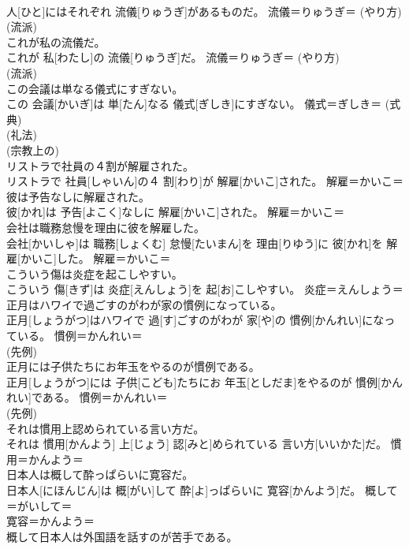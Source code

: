 \documentclass[8pt]{extreport}
\begin{document}
\begin{CJK}{UTF8}{min}
{\\	人[ひと]にはそれぞれ 流儀[りゅうぎ]があるものだ。	流儀＝りゅうぎ＝ (やり方) 
\\	(流派) 
\\	これが私の流儀だ。	
\\	これが 私[わたし]の 流儀[りゅうぎ]だ。	流儀＝りゅうぎ＝ (やり方) 
\\	(流派) 
\\	この会議は単なる儀式にすぎない。	
\\	この 会議[かいぎ]は 単[たん]なる 儀式[ぎしき]にすぎない。	儀式＝ぎしき＝ (式典) 
\\	(礼法) 
\\	(宗教上の) 
\\	リストラで社員の４割が解雇された。	
\\	リストラで 社員[しゃいん]の４ 割[わり]が 解雇[かいこ]された。	解雇＝かいこ＝ 
\\	彼は予告なしに解雇された。	
\\	彼[かれ]は 予告[よこく]なしに 解雇[かいこ]された。	解雇＝かいこ＝ 
\\	会社は職務怠慢を理由に彼を解雇した。	
\\	会社[かいしゃ]は 職務[しょくむ] 怠慢[たいまん]を 理由[りゆう]に 彼[かれ]を 解雇[かいこ]した。	解雇＝かいこ＝ 
\\	こういう傷は炎症を起こしやすい。	
\\	こういう 傷[きず]は 炎症[えんしょう]を 起[お]こしやすい。	炎症＝えんしょう＝ 
\\	正月はハワイで過ごすのがわが家の慣例になっている。	
\\	正月[しょうがつ]はハワイで 過[す]ごすのがわが 家[や]の 慣例[かんれい]になっている。	慣例＝かんれい＝ 
\\	(先例) 
\\	正月には子供たちにお年玉をやるのが慣例である。	
\\	正月[しょうがつ]には 子供[こども]たちにお 年玉[としだま]をやるのが 慣例[かんれい]である。	慣例＝かんれい＝ 
\\	(先例) 
\\	それは慣用上認められている言い方だ。	
\\	それは 慣用[かんよう] 上[じょう] 認[みと]められている 言い方[いいかた]だ。	慣用＝かんよう＝ 
\\	日本人は概して酔っぱらいに寛容だ。	
\\	日本人[にほんじん]は 概[がい]して 酔[よ]っぱらいに 寛容[かんよう]だ。	概して＝がいして＝ 
\\	寛容＝かんよう＝ 
\\	概して日本人は外国語を話すのが苦手である。	
}
\end{CJK}
\end{document}
